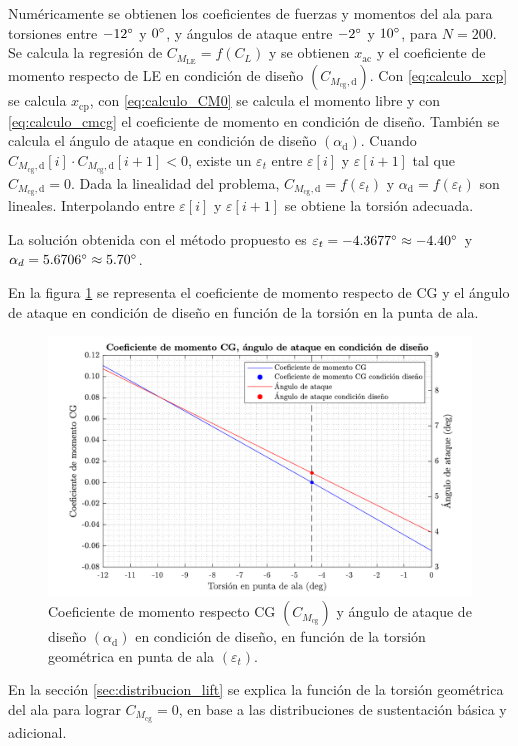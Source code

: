 Numéricamente se obtienen los coeficientes de fuerzas y momentos del ala para torsiones entre $-12\mathrm{^{\circ}}$ y $0\mathrm{^{\circ}}$, y ángulos de ataque entre $-2\mathrm{^{\circ}}$ y $10\mathrm{^{\circ}}$, para $N = 200$. Se calcula la regresión de $C_{M_\text{LE}} = f \left( C_L \right)$ y se obtienen $x_\text{ac}$ y el coeficiente de momento respecto de LE en condición de diseño $\left( C_{M_\text{cg},\text{d}} \right)$. Con \eqref{eq:calculo_xcp} se calcula $x_\text{cp}$, con \eqref{eq:calculo_CM0} se calcula el momento libre y con \eqref{eq:calculo_cmcg} el coeficiente de momento en condición de diseño. También se calcula el ángulo de ataque en condición de diseño $\left( \alpha_\text{d} \right)$. Cuando $C_{M_\text{cg},\text{d}}[i] \cdot C_{M_\text{cg},\text{d}} [i+1] < 0$, existe un $\varepsilon_t$ entre $\varepsilon[i]$ y $\varepsilon[i+1]$ tal que $C_{M_\text{cg},\text{d}} = 0$. Dada la linealidad del problema, $C_{M_\text{cg},\text{d}} = f \left( \varepsilon_t \right)$ y $\alpha_\text{d} = f \left( \varepsilon_t \right)$ son lineales. Interpolando entre $\varepsilon[i]$ y $\varepsilon[i+1]$ se obtiene la torsión adecuada. 

La solución obtenida con el método propuesto es $\varepsilon_t = -4.3677 \mathrm{^{\circ}} \approx -4.40 \mathrm{^{\circ}}$ y $\alpha_d = 5.6706 \mathrm{^{\circ}} \approx 5.70 \mathrm{^{\circ}}$.

En la figura \ref{fig:trim_wing} se representa el coeficiente de momento respecto de CG y el ángulo de ataque en condición de diseño en función de la torsión en la punta de ala.

\begin{figure}[h]
    \centering
    \includegraphics[width=\linewidth]{imagenes/ajuste_torsion/trim_wing.pdf}
    \caption{Coeficiente de momento respecto CG $( C_{M_\text{cg}} )$ y ángulo de ataque de diseño $\left( \alpha_\text{d} \right)$ en condición de diseño, en función de la torsión geométrica en punta de ala $\left( \varepsilon_t \right)$.}
    \label{fig:trim_wing}
    \vspace{-4mm}
\end{figure}

En la sección \ref{sec:distribucion_lift} se explica la función de la torsión geométrica del ala para lograr $C_{M_\text{cg}} = 0$, en base a las distribuciones de sustentación básica y adicional.












